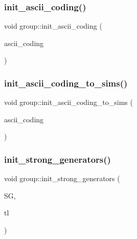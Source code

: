 \subsubsection{\texorpdfstring{init\+\_\+ascii\+\_\+coding()}{init\_ascii\_coding()}}
{\footnotesize\ttfamily void group\+::init\+\_\+ascii\+\_\+coding (\begin{DoxyParamCaption}\item[{const char $\ast$}]{ascii\+\_\+coding }\end{DoxyParamCaption})}

\mbox{\label{classgroup_ac868c381717192f1a8f0ece1158a3cb5}} 
\subsubsection{\texorpdfstring{init\+\_\+ascii\+\_\+coding\+\_\+to\+\_\+sims()}{init\_ascii\_coding\_to\_sims()}}
{\footnotesize\ttfamily void group\+::init\+\_\+ascii\+\_\+coding\+\_\+to\+\_\+sims (\begin{DoxyParamCaption}\item[{const char $\ast$}]{ascii\+\_\+coding }\end{DoxyParamCaption})}

\mbox{\label{classgroup_aca8ce81c001eb5871118ed21676f3519}} 
\subsubsection{\texorpdfstring{init\+\_\+strong\+\_\+generators()}{init\_strong\_generators()}}
{\footnotesize\ttfamily void group\+::init\+\_\+strong\+\_\+generators (\begin{DoxyParamCaption}\item[{\mbox{\hyperlink{classvector__ge}{vector\+\_\+ge}} \&}]{SG,  }\item[{\mbox{\hyperlink{galois_8h_a09fddde158a3a20bd2dcadb609de11dc}{I\+NT}} $\ast$}]{tl }\end{DoxyParamCaption})}

\mbox{\label{classgroup_a65100d600cfb0955dae3582a2d6a2532}} 
